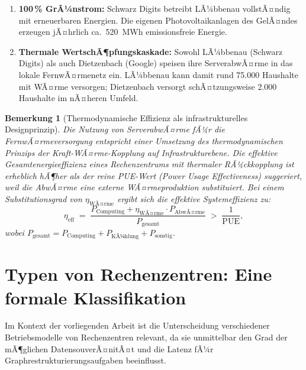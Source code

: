 ﻿\documentclass[12pt, a4paper, openany]{report}
\newtheorem{remark}[theorem]{Bemerkung}
\begin{document}
\begin{enumerate}[label=(\arabic*)]
	\item \textbf{100\,\% GrÃ¼nstrom:} Schwarz Digits betreibt LÃ¼bbenau
	vollstÃ¤ndig mit erneuerbaren Energien. Die eigenen Photovoltaikanlagen
	des GelÃ¤ndes erzeugen jÃ¤hrlich ca.\ 520~MWh emissionsfreie Energie.
	\item \textbf{Thermale WertschÃ¶pfungskaskade:} Sowohl LÃ¼bbenau (Schwarz
	Digits) als auch Dietzenbach (Google) speisen ihre ServerabwÃ¤rme in
	das lokale FernwÃ¤rmenetz ein. LÃ¼bbenau kann damit rund 75.000 Haushalte
	mit WÃ¤rme versorgen; Dietzenbach versorgt schÃ¤tzungsweise 2.000 Haushalte
	im nÃ¤heren Umfeld.
\end{enumerate}

\begin{remark}[Thermodynamische Effizienz als infrastrukturelles Designprinzip]
	\label{rem:thermodynamik}
	Die Nutzung von ServerabwÃ¤rme fÃ¼r die FernwÃ¤rmeversorgung entspricht einer
	Umsetzung des thermodynamischen Prinzips der Kraft-WÃ¤rme-Kopplung auf
	Infrastrukturebene. Die effektive Gesamtenergieeffizienz eines Rechenzentrums
	mit thermaler RÃ¼ckkopplung ist erheblich hÃ¶her als der reine
	PUE-Wert (Power Usage Effectiveness) suggeriert, weil die AbwÃ¤rme eine
	externe WÃ¤rmeproduktion substituiert. Bei einem Substitutionsgrad von
	$\eta_{\text{WÃ¤rme}}$ ergibt sich die effektive Systemeffizienz zu:
	\[
	\eta_{\text{eff}}
	\;=\;
	\frac{P_{\text{Computing}} + \eta_{\text{WÃ¤rme}} \cdot P_{\text{AbwÃ¤rme}}}
	{P_{\text{gesamt}}}
	\;>\; \frac{1}{\text{PUE}},
	\]
	wobei $P_{\text{gesamt}} = P_{\text{Computing}} + P_{\text{KÃ¼hlung}} + P_{\text{sonstig}}$.
\end{remark}

\section{Typen von Rechenzentren: Eine formale Klassifikation}
\label{sec:rz_typen}

Im Kontext der vorliegenden Arbeit ist die Unterscheidung verschiedener
Betriebsmodelle von Rechenzentren relevant, da sie unmittelbar den Grad
der mÃ¶glichen DatensouverÃ¤nitÃ¤t und die Latenz fÃ¼r Graphrestrukturierungsaufgaben
beeinflusst.
\end{document}
